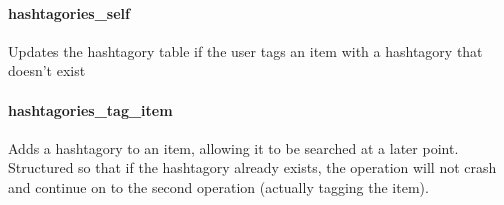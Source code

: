 \paragraph{hashtagories\_self}\label{hashtagoriesux5fself}

Updates the hashtagory table if the user tags an item with a hashtagory
that doesn't exist

\begin{Shaded}
\begin{Highlighting}[]
  \NormalTok{(}\NormalTok{))}
      
\end{Highlighting}
\end{Shaded}

\paragraph{hashtagories\_tag\_item}\label{hashtagoriesux5ftagux5fitem}

Adds a hashtagory to an item, allowing it to be searched at a later
point. Structured so that if the hashtagory already exists, the
operation will not crash and continue on to the second operation
(actually tagging the item).

\begin{Shaded}
\begin{Highlighting}[]
  \NormalTok{(}\NormalTok{), } \NormalTok{(}\NormalTok{))}
  \NormalTok{(}    
  
  
 \NormalTok{;}
\end{Highlighting}
\end{Shaded}

